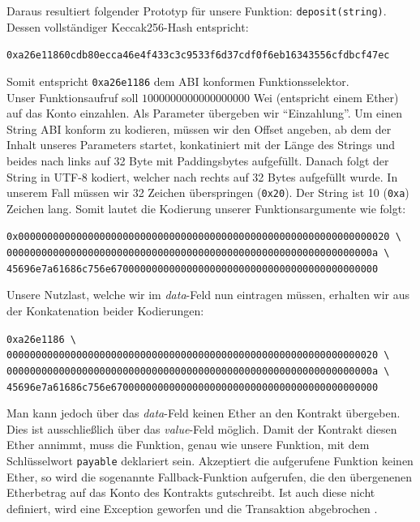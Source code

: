 \documentclass[runningheads]{llncs}
\begin{document}
Daraus resultiert folgender Prototyp für unsere Funktion: \verb+deposit(string)+.
Dessen vollständiger Keccak256-Hash entspricht:
\begingroup
\fontsize{8pt}{10pt}\selectfont
\begin{center}
  \verb+0xa26e11860cdb80ecca46e4f433c3c9533f6d37cdf0f6eb16343556cfdbcf47ec+
\end{center}
\endgroup
Somit entspricht \verb+0xa26e1186+ dem ABI konformen Funktionsselektor.\\
Unser Funktionsaufruf soll $1000000000000000000$ Wei (entspricht einem Ether) auf das Konto einzahlen. Als Parameter übergeben wir "`Einzahlung"'. Um einen String ABI konform zu kodieren, müssen wir den Offset angeben, ab dem der Inhalt unseres Parameters startet, konkatiniert mit der Länge des Strings und beides nach links auf 32 Byte mit Paddingsbytes aufgefüllt. Danach folgt der String in UTF-8 kodiert, welcher nach rechts auf 32 Bytes aufgefüllt wurde. In unserem Fall müssen wir 32 Zeichen überspringen (\texttt{0x20}). Der String ist 10 (\texttt{0xa}) Zeichen lang. Somit lautet die Kodierung unserer Funktionsargumente wie folgt:
\begingroup
\fontsize{8pt}{10pt}\selectfont
\begin{center}
  \texttt{0x0000000000000000000000000000000000000000000000000000000000000020 \textbackslash} \\
  \texttt{000000000000000000000000000000000000000000000000000000000000000a \textbackslash} \\
  \texttt{45696e7a61686c756e6700000000000000000000000000000000000000000000}
\end{center}
\endgroup
Unsere Nutzlast, welche wir im \textit{data}-Feld nun eintragen müssen, erhalten wir aus der Konkatenation beider Kodierungen:
\begingroup
\fontsize{8pt}{10pt}\selectfont
\begin{center}
  \texttt{0xa26e1186 \textbackslash} \\
  \texttt{0000000000000000000000000000000000000000000000000000000000000020 \textbackslash} \\
  \texttt{000000000000000000000000000000000000000000000000000000000000000a \textbackslash} \\
  \texttt{45696e7a61686c756e6700000000000000000000000000000000000000000000}
\end{center}
\endgroup
Man kann jedoch über das \textit{data}-Feld keinen Ether an den Kontrakt übergeben. Dies ist ausschließlich über das \textit{value}-Feld möglich. Damit der Kontrakt diesen Ether annimmt, muss die Funktion, genau wie unsere Funktion, mit dem Schlüsselwort \texttt{payable} deklariert sein. Akzeptiert die aufgerufene Funktion keinen Ether, so wird die sogenannte Fallback-Funktion aufgerufen, die den übergenenen Etherbetrag auf das Konto des Kontrakts gutschreibt. Ist auch diese nicht definiert, wird eine Exception geworfen und die Transaktion abgebrochen \cite{noauthor_contract_nodate}.
\end{document}
